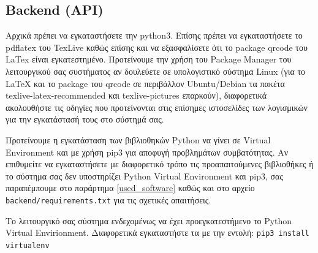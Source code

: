 \documentclass[a4paper]{article}
\begin{document}
\subsection{Backend (API)}

\par Αρχικά πρέπει να εγκαταστήσετε την python3. Επίσης πρέπει να εγκαταστήσετε το pdflatex του TexLive καθώς επίσης και να εξασφαλίσετε ότι το package qrcode του LaTex είναι εγκατεστημένο. Προτείνουμε την χρήση του Package Manager του λειτουργικού σας συστήματος αν δουλεύετε σε υπολογιστικό σύστημα Linux (για το LaTeX και το package του qrcode σε περιβάλλον Ubuntu/Debian τα πακέτα texlive-latex-recommended και texlive-pictures επαρκούν), διαφορετικά ακολουθήστε τις οδηγίες που προτείνονται στις επίσημες ιστοσελίδες των λογισμικών για την εγκατάστασή τους στο σύστημά σας.

\par Προτείνουμε η εγκατάσταση των βιβλιοθηκών Python να γίνει σε Virtual Environment και με χρήση pip3 για αποφυγή προβλημάτων συμβατότητας. Αν επιθυμείτε να εγκαταστήσετε με διαφορετικό τρόπο τις προαπαιτούμενες βιβλιοθήκες ή το σύστημα σας δεν υποστηρίζει Python Virtual Environment και pip3, σας παραπέμπουμε στο παράρτημα \ref{used_software} καθώς και στο αρχείο \texttt{backend/requirements.txt} για τις σχετικές απαιτήσεις.

\par Το λειτουργικό σας σύστημα ενδεχομένως να έχει προεγκατεστήμενο το Python Virtual Envirionment. Διαφορετικά εγκαταστήστε τα με την εντολή: \texttt{pip3 install virtualenv}
\end{document}
